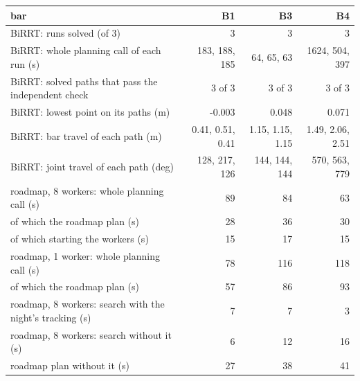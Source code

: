 \begin{tabular}{@{}>{\raggedright\arraybackslash}p{7.4cm} rrr@{}}
\toprule
bar & B1 & B3 & B4 \\
\midrule
BiRRT: runs solved (of 3) & 3 & 3 & 3 \\
BiRRT: whole planning call of each run (s) & 183, 188, 185 & 64, 65, 63 & 1624, 504, 397 \\
BiRRT: solved paths that pass the independent check & 3 of 3 & 3 of 3 & 3 of 3 \\
BiRRT: lowest point on its paths (m) & -0.003 & 0.048 & 0.071 \\
BiRRT: bar travel of each path (m) & 0.41, 0.51, 0.41 & 1.15, 1.15, 1.15 & 1.49, 2.06, 2.51 \\
BiRRT: joint travel of each path (deg) & 128, 217, 126 & 144, 144, 144 & 570, 563, 779 \\
\midrule
roadmap, 8 workers: whole planning call (s) & 89 & 84 & 63 \\
\quad of which the roadmap plan (s) & 28 & 36 & 30 \\
\quad of which starting the workers (s) & 15 & 17 & 15 \\
roadmap, 1 worker: whole planning call (s) & 78 & 116 & 118 \\
\quad of which the roadmap plan (s) & 57 & 86 & 93 \\
\midrule
roadmap, 8 workers: search with the night's tracking (s) & 7 & 7 & 3 \\
roadmap, 8 workers: search without it (s) & 6 & 12 & 16 \\
\quad roadmap plan without it (s) & 27 & 38 & 41 \\
\bottomrule
\end{tabular}
